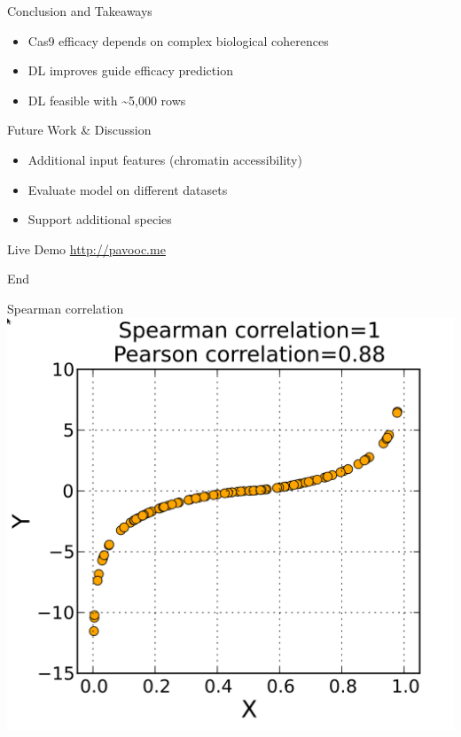 \documentclass[Nike]{tuberlinbeamer}
\begin{document}
\begin{frame}{Conclusion and Takeaways}
  \begin{itemize}
    \item Cas9 efficacy depends on complex biological coherences %
    \item DL improves guide efficacy prediction %
    \item DL feasible with \textasciitilde5,000 rows
  \end{itemize}

\end{frame}


\begin{frame}{Future Work \& Discussion}
  \begin{itemize}
    \item Additional input features (chromatin accessibility)
    \item Evaluate model on different datasets
    \item Support additional species
  \end{itemize}
\end{frame}

\begin{frame}{Live Demo}
  \url{http://pavooc.me}
\end{frame}

\begin{frame}{End}
\end{frame}

\begin{frame}{Spearman correlation}
  \includegraphics[width=0.50\linewidth]{./Spearman1.png}
\end{frame}
\end{document}
